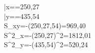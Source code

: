\bar{x}==250,27\\
\bar{y}==435,54\\
S_{xy}=-(250,27,54)=969,40\\
S^2_{x}=-(250,27)^2=1812,01\\
S^2_{y}=-(435,54)^2=520,24





